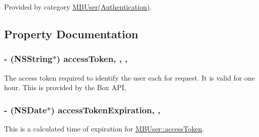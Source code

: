 Provided by category \hyperlink{category_m_b_user_07_authentication_08_a1e56d1480e455bac35e1a57a2db7fb47}{M\-B\-User(\-Authentication)}.



\subsection{Property Documentation}
\hypertarget{interface_m_b_user_aae7d6df5c0e6da13e80b3ddb82ae7081}{
\subsubsection[{access\-Token}]{\setlength{\rightskip}{0pt plus 5cm}-\/ (N\-S\-String$\ast$) access\-Token\hspace{0.3cm}{\ttfamily [read]}, {\ttfamily [write]}, {\ttfamily [nonatomic]}, {\ttfamily [strong]}}}\label{interface_m_b_user_aae7d6df5c0e6da13e80b3ddb82ae7081}
The access token required to identify the user each for request. It is valid for one hour. This is provided by the Box A\-P\-I. \hypertarget{interface_m_b_user_a66df6e37883628503b521d292bbe692b}{
\subsubsection[{access\-Token\-Expiration}]{\setlength{\rightskip}{0pt plus 5cm}-\/ (N\-S\-Date$\ast$) access\-Token\-Expiration\hspace{0.3cm}{\ttfamily [read]}, {\ttfamily [nonatomic]}, {\ttfamily [strong]}}}\label{interface_m_b_user_a66df6e37883628503b521d292bbe692b}


This is a calculated time of expiration for \hyperlink{interface_m_b_user_aae7d6df5c0e6da13e80b3ddb82ae7081}{M\-B\-User\-::access\-Token}. 

